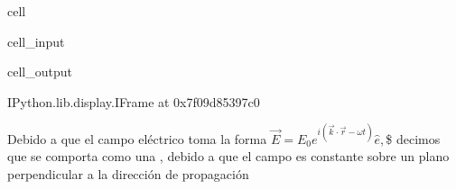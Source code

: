 \documentclass[letterpaper,10pt,english]{jupyterBook}
\let\sphinxpxdimen\pdfpxdimen\else\newdimen\sphinxpxdimen
\begin{document}
\begin{sphinxuseclass}{cell}\begin{sphinxVerbatimInput}

\begin{sphinxuseclass}{cell_input}
\begin{sphinxVerbatim}[commandchars=\\\{\}]
    
 
\end{sphinxVerbatim}

\end{sphinxuseclass}\end{sphinxVerbatimInput}
\begin{sphinxVerbatimOutput}

\begin{sphinxuseclass}{cell_output}
\begin{sphinxVerbatim}[commandchars=\\\{\}]
\PYGZlt{}IPython.lib.display.IFrame at 0x7f09d85397c0\PYGZgt{}
\end{sphinxVerbatim}

\end{sphinxuseclass}\end{sphinxVerbatimOutput}

\end{sphinxuseclass}
\sphinxAtStartPar
Debido a que el campo eléctrico toma la forma \(\vec{E} = E_0 e^{i\left(\vec{k}\cdot\vec{r} - \omega t\right)} \hat{e},\)\$  decimos que se comporta como una , debido a que el campo es constante sobre un plano perpendicular a la dirección de propagación

\noindent{\hspace*{\fill}\sphinxincludegraphics[width=400\sphinxpxdimen]{{planewave}.png}\hspace*{\fill}}
\end{document}
